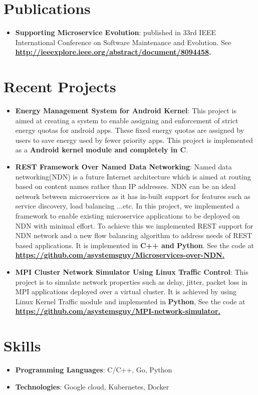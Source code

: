 \documentclass[letterpaper,11pt]{article}
\newcommand{\resumeItem}[2]{
  \item\small{
    \textbf{#1}{: #2 \vspace{-2pt}}
  }
}
\newcommand{\resumeSubItem}[2]{\resumeItem{#1}{#2}\vspace{-4pt}}
\newcommand{\resumeSubHeadingListStart}{\begin{itemize}[leftmargin=*]}
\newcommand{\resumeSubHeadingListEnd}{\end{itemize}}
\begin{document}
\section{Publications}
  \resumeSubHeadingListStart
    \resumeSubItem {Supporting Microservice Evolution} {published in 33rd IEEE International Conference on Software Maintenance and Evolution. 
    See \textbf{\href{http://ieeexplore.ieee.org/abstract/document/8094458}{http://ieeexplore.ieee.org/abstract/document/8094458}.}
    }
  \resumeSubHeadingListEnd

\section{Recent Projects}
  \resumeSubHeadingListStart
    \resumeSubItem{Energy Management System for Android Kernel}
      {This project is aimed at creating a system to enable assigning and enforcement of strict energy quotas for android apps. 
      These fixed energy quotas are assigned by users to save energy used by fewer priority apps.
      This project is implemented as a \textbf{Android kernel module and completely in C}.}
    \resumeSubItem{REST Framework Over Named Data Networking}
      {Named data networking(NDN) is a future Internet architecture which is aimed at routing based on content names rather than IP addresses. 
       NDN can be an ideal network between microservices as it has in-built support for features such as service discovery, load balancing ...etc. 
       In this project, we implemented a framework to enable existing microservice applications to be deployed on NDN with minimal effort.
       To achieve this we implemented REST support for NDN network and a new flow balancing algorithm to address needs of REST based applications.
       It is implemented in \textbf{C++ and Python}. 
       See the code at \textbf{\href{https://github.com/asystemsguy/Microservices-over-NDN}{https://github.com/asystemsguy/Microservices-over-NDN.}}
      }
    \resumeSubItem{MPI Cluster Network Simulator Using Linux Traffic Control}
      {This project is to simulate network properties such as delay, jitter, packet loss in MPI applications deployed over a virtual cluster.
       It is achieved by using Linux Kernel Traffic module and implemented in \textbf{Python}, 
       See the code at \textbf{\href{ https://github.com/asystemsguy/MPI-network-simulator}{https://github.com/asystemsguy/MPI-network-simulator.}}}
 \resumeSubHeadingListEnd


\section{Skills}
  \resumeSubHeadingListStart
    \item{
      \textbf{Programming Languages}{: C/C++, Go, Python }
      \hfill
      }
    \item{
    \textbf{Technologies}{: Google cloud, Kubernetes, Docker}
    }
 \resumeSubHeadingListEnd


\end{document}
